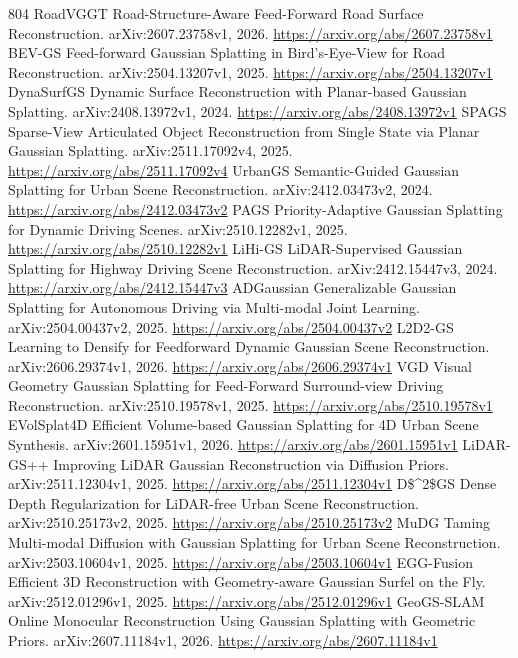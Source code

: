 \documentclass[11pt]{article}
\begin{document}
\begin{thebibliography}{804}
 RoadVGGT Road-Structure-Aware Feed-Forward Road Surface Reconstruction. arXiv:2607.23758v1, 2026. \url{https://arxiv.org/abs/2607.23758v1}
 BEV-GS Feed-forward Gaussian Splatting in Bird's-Eye-View for Road Reconstruction. arXiv:2504.13207v1, 2025. \url{https://arxiv.org/abs/2504.13207v1}
 DynaSurfGS Dynamic Surface Reconstruction with Planar-based Gaussian Splatting. arXiv:2408.13972v1, 2024. \url{https://arxiv.org/abs/2408.13972v1}
 SPAGS Sparse-View Articulated Object Reconstruction from Single State via Planar Gaussian Splatting. arXiv:2511.17092v4, 2025. \url{https://arxiv.org/abs/2511.17092v4}
 UrbanGS Semantic-Guided Gaussian Splatting for Urban Scene Reconstruction. arXiv:2412.03473v2, 2024. \url{https://arxiv.org/abs/2412.03473v2}
 PAGS Priority-Adaptive Gaussian Splatting for Dynamic Driving Scenes. arXiv:2510.12282v1, 2025. \url{https://arxiv.org/abs/2510.12282v1}
 LiHi-GS LiDAR-Supervised Gaussian Splatting for Highway Driving Scene Reconstruction. arXiv:2412.15447v3, 2024. \url{https://arxiv.org/abs/2412.15447v3}
 ADGaussian Generalizable Gaussian Splatting for Autonomous Driving via Multi-modal Joint Learning. arXiv:2504.00437v2, 2025. \url{https://arxiv.org/abs/2504.00437v2}
 L2D2-GS Learning to Densify for Feedforward Dynamic Gaussian Scene Reconstruction. arXiv:2606.29374v1, 2026. \url{https://arxiv.org/abs/2606.29374v1}
 VGD Visual Geometry Gaussian Splatting for Feed-Forward Surround-view Driving Reconstruction. arXiv:2510.19578v1, 2025. \url{https://arxiv.org/abs/2510.19578v1}
 EVolSplat4D Efficient Volume-based Gaussian Splatting for 4D Urban Scene Synthesis. arXiv:2601.15951v1, 2026. \url{https://arxiv.org/abs/2601.15951v1}
 LiDAR-GS++ Improving LiDAR Gaussian Reconstruction via Diffusion Priors. arXiv:2511.12304v1, 2025. \url{https://arxiv.org/abs/2511.12304v1}
 D\$\textasciicircum{}2\$GS Dense Depth Regularization for LiDAR-free Urban Scene Reconstruction. arXiv:2510.25173v2, 2025. \url{https://arxiv.org/abs/2510.25173v2}
 MuDG Taming Multi-modal Diffusion with Gaussian Splatting for Urban Scene Reconstruction. arXiv:2503.10604v1, 2025. \url{https://arxiv.org/abs/2503.10604v1}
 EGG-Fusion Efficient 3D Reconstruction with Geometry-aware Gaussian Surfel on the Fly. arXiv:2512.01296v1, 2025. \url{https://arxiv.org/abs/2512.01296v1}
 GeoGS-SLAM Online Monocular Reconstruction Using Gaussian Splatting with Geometric Priors. arXiv:2607.11184v1, 2026. \url{https://arxiv.org/abs/2607.11184v1}

\end{thebibliography}
\end{document}
